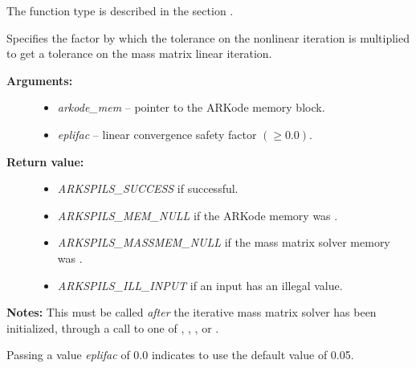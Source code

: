 \documentclass[letterpaper,10pt,english]{sphinxmanual}
\begin{document}
\begin{fulllineitems}
The function type {\hyperref[c_interface/User_supplied:c.ARKSpilsMassTimesVecFn]{\emph{}}} is described
in the section {\hyperref[c_interface/User_supplied:cinterface-usersupplied]{\emph{}}}.

\end{fulllineitems}


\begin{fulllineitems}
\label{c_interface/User_callable:c.ARKSpilsSetMassEpsLin}
Specifies the factor by which the tolerance on the nonlinear
iteration is multiplied to get a tolerance on the mass matrix
linear iteration.
\begin{description}
\item[{\textbf{Arguments:}}] \leavevmode\begin{itemize}
\item {} 
\emph{arkode\_mem} -- pointer to the ARKode memory block.

\item {} 
\emph{eplifac} -- linear convergence safety factor \((\ge 0.0)\).

\end{itemize}

\item[{\textbf{Return value:}}] \leavevmode\begin{itemize}
\item {} 
\emph{ARKSPILS\_SUCCESS} if successful.

\item {} 
\emph{ARKSPILS\_MEM\_NULL} if the ARKode memory was .

\item {} 
\emph{ARKSPILS\_MASSMEM\_NULL} if the mass matrix solver memory was .

\item {} 
\emph{ARKSPILS\_ILL\_INPUT} if an input has an illegal value.

\end{itemize}

\end{description}

\textbf{Notes:} This must be called \emph{after} the iterative mass matrix
solver has been initialized, through a call to one of
{\hyperref[c_interface/User_callable:c.ARKMassSpgmr]{\emph{}}}, {\hyperref[c_interface/User_callable:c.ARKMassSpbcg]{\emph{}}},
{\hyperref[c_interface/User_callable:c.ARKMassSptfqmr]{\emph{}}}, {\hyperref[c_interface/User_callable:c.ARKMassSpfgmr]{\emph{}}} or
{\hyperref[c_interface/User_callable:c.ARKMassPcg]{\emph{}}}.

Passing a value \emph{eplifac} of 0.0 indicates to use the default value
of 0.05.

\end{fulllineitems}
\end{document}
